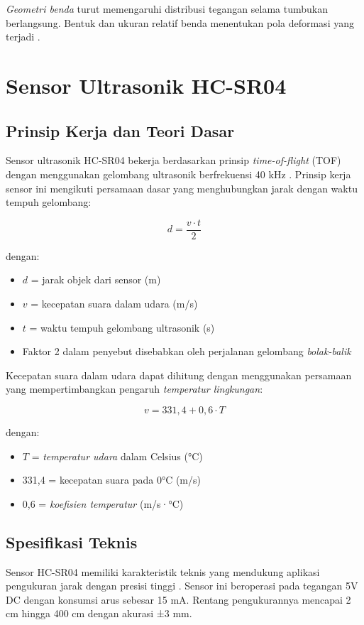 \textit{Geometri benda} turut memengaruhi distribusi tegangan selama tumbukan berlangsung. Bentuk dan ukuran relatif benda menentukan pola deformasi yang terjadi \citep{stronge2018impact}.

\section{Sensor Ultrasonik HC-SR04}

\subsection{Prinsip Kerja dan Teori Dasar}
Sensor ultrasonik HC-SR04 bekerja berdasarkan prinsip \textit{time-of-flight} (TOF) dengan menggunakan gelombang ultrasonik berfrekuensi 40 kHz \citep{fauzi2020pengujian}. Prinsip kerja sensor ini mengikuti persamaan dasar yang menghubungkan jarak dengan waktu tempuh gelombang:

\begin{equation}
    d = \frac{v \cdot t}{2}
\end{equation}

dengan:
\begin{itemize}
    \item $d$ = jarak objek dari sensor (m)
    \item $v$ = kecepatan suara dalam udara (m/s)
    \item $t$ = waktu tempuh gelombang ultrasonik (s)
    \item Faktor 2 dalam penyebut disebabkan oleh perjalanan gelombang \textit{bolak-balik}
\end{itemize}

Kecepatan suara dalam udara dapat dihitung dengan menggunakan persamaan yang mempertimbangkan pengaruh \textit{temperatur lingkungan}:

\begin{equation}
    v = 331,4 + 0,6 \cdot T
\end{equation}

dengan:
\begin{itemize}
    \item $T$ = \textit{temperatur udara} dalam Celsius (°C)
    \item 331,4 = kecepatan suara pada 0°C (m/s)
    \item 0,6 = \textit{koefisien temperatur} (m/s·°C)
\end{itemize}

\subsection{Spesifikasi Teknis}
Sensor HC-SR04 memiliki karakteristik teknis yang mendukung aplikasi pengukuran jarak dengan presisi tinggi \citep{siregar2021sensor}. Sensor ini beroperasi pada tegangan 5V DC dengan konsumsi arus sebesar 15 mA. Rentang pengukurannya mencapai 2 cm hingga 400 cm dengan akurasi ±3 mm. 

